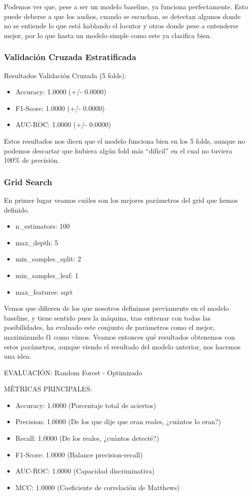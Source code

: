 Podemos ver que, pese a ser un modelo baseline, ya funciona perfectamente. Esto puede deberse a que los audios, cuando se escuchan, se detectan algunos donde no se entiende lo que está hablando el locutor y otros donde pese a entenderse mejor, por lo que hasta un modelo simple como este ya clasifica bien.

\subsubsection*{Validación Cruzada Estratificada}

Resultados Validación Cruzada (5 folds):
\begin{itemize}
	\item Accuracy: 1.0000 (+/- 0.0000)
	\item F1-Score: 1.0000 (+/- 0.0000)
	\item AUC-ROC:  1.0000 (+/- 0.0000)
\end{itemize}
   
Estos resultados nos dicen que el modelo funciona bien en los 5 folds, aunque no podemos descartar que hubiera algún fold más ``difícil'' en el cual no tuviera 100\% de precisión.

\subsubsection*{Grid Search}

En primer lugar veamos cuáles son los mejores parámetros del grid que hemos definido.

\begin{itemize}
	\item n\_estimators: 100
	\item max\_depth: 5
	\item min\_samples\_split: 2
	\item min\_samples\_leaf: 1
	\item max\_features: sqrt
\end{itemize}


Vemos que difieren de los que nosotros definimos previamente en el modelo baseline, y tiene sentido pues la máquina, tras entrenar con todas las posibilidades, ha evaluado este conjunto de parámetros como el mejor, maximizando f1 como vimos. Veamos entonces qué resultados obtenemos con estos parámetros, aunque viendo el resultado del modelo anterior, nos hacemos una idea.

EVALUACIÓN: Random Forest - Optimizado

MÉTRICAS PRINCIPALES:
\begin{itemize}
	\item Accuracy:  1.0000  (Porcentaje total de aciertos)
	\item Precision: 1.0000  (De los que dije que eran reales, ¿cuántos lo eran?)
	\item Recall:    1.0000  (De los reales, ¿cuántos detecté?)
	\item F1-Score:  1.0000  (Balance precision-recall)
	\item AUC-ROC:   1.0000  (Capacidad discriminativa)
	\item MCC:       1.0000  (Coeficiente de correlación de Matthews)
\end{itemize}

